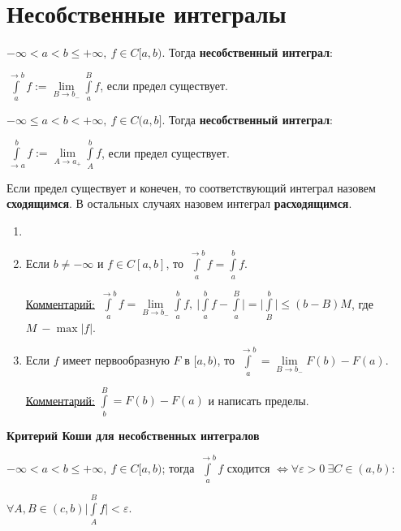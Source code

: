 \section{Несобственные интегралы}

\begin{definition}
    $-\infty < a < b\leq +\infty,\ f\in C[a,b).$ Тогда \textbf{несобственный интеграл}:

    $\int\limits_a^{\rightarrow b}f:=\lim \limits_{B\rightarrow b_-}\int\limits_a^Bf$, если предел существует.
\end{definition}

\begin{definition}
    $-\infty \leq a < b< +\infty,\ f\in C(a,b].$ Тогда \textbf{несобственный интеграл}:

    $\int\limits_{\rightarrow a}^b f:=\lim \limits_{A\rightarrow a_+}\int\limits_A^b f$, если предел существует.
\end{definition}

\begin{definition}
    Если предел существует и конечен, то соответствующий интеграл назовем \textbf{сходящимся}. В остальных случаях назовем интеграл \textbf{расходящимся}.
\end{definition}

\begin{remark}
    \begin{enumerate}
        \item[]
        \item Если $b\neq -\infty$ и $f\in C[a,b]$, то $\int\limits_a^{\rightarrow b} f = \int\limits_a^{b} f$.

        \underline{Комментарий:} $\int\limits_a^{\rightarrow b} f=\lim\limits_{B\rightarrow b_-}\int\limits_a^{b}f,\ \bigg|\int\limits_a^b f-\int\limits_a^B\bigg|=\bigg|\int\limits_B^b\bigg|\leq (b-B)M$, где $M\ -\max |f|$.

        \item Если $f$ имеет первообразную $F$ в $[a,b)$, то $\int\limits_a^{\rightarrow b}=\lim\limits_{B\rightarrow b_-} F(b)-F(a)$.

        \underline{Комментарий:} $\int\limits_b^B=F(b)-F(a)$ и написать пределы.
    \end{enumerate}
\end{remark}

\begin{theorem}
    \textbf{Критерий Коши для несобственных интегралов}

    $-\infty <a<b\leq +\infty,\ f\in C[a,b)$; тогда $\int\limits_a^{\rightarrow b}f$ сходится $\Leftrightarrow\forall \varepsilon>0\ \exists C\in (a,b): $

    $\forall A,B\in (c,b) \bigg|\int\limits_A^B f\bigg |<\varepsilon$.
\end{theorem}

